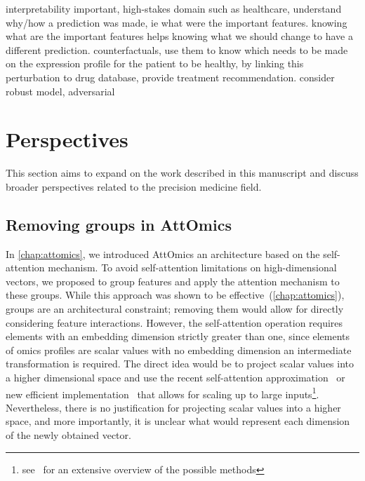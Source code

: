 \documentclass[../main.tex]{subfiles}
\begin{document}
	interpretability important, high-stakes domain such as healthcare, understand why/how a prediction was made, ie what were the important features.
	knowing what are the important features helps knowing what we should change to have a different prediction.
	counterfactuals, use them to know which needs to be made on the expression profile for the patient to be healthy, by linking this perturbation to drug database, provide treatment recommendation.
	consider robust model, adversarial

\section{Perspectives}
	This section aims to expand on the work described in this manuscript and discuss broader perspectives related to the precision medicine field.
	\subsection{Removing groups in AttOmics}\label{sec:scalar_attention}
		In \cref{chap:attomics}, we introduced AttOmics an architecture based on the self-attention mechanism.
		To avoid self-attention limitations on high-dimensional vectors, we proposed to group features and apply the attention mechanism to these groups.
		While this approach was shown to be effective~(\cref{chap:attomics}), groups are an architectural constraint; removing them would allow for directly considering feature interactions.
		However, the self-attention operation requires elements with an embedding dimension strictly greater than one, since elements of omics profiles are scalar values with no embedding dimension an intermediate transformation is required.
		The direct idea would be to project scalar values into a higher dimensional space and use the recent self-attention approximation~\cite{xiongNystrOmformerNystr2021,Linformer} or new efficient implementation~\cite{FlashAttention,rabeSelfattentionDoesNot2021,bolyaHydraAttentionEfficient2022a} that allows for scaling up to large inputs\footnote{see~\cite{EfficientTransformers} for an extensive overview of the possible methods}.
		Nevertheless, there is no justification for projecting scalar values into a higher space, and more importantly, it is unclear what would represent each dimension of the newly obtained vector.
\end{document}
